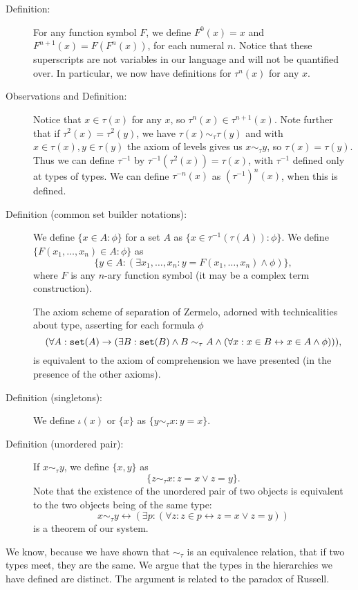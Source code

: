 \documentclass[12pt]{book}
\begin{document}
\begin{description}

\item[Definition:]  For any function symbol $F$, we define $F^0(x) = x$ and $F^{n+1}(x) = F(F^n(x))$, for each numeral $n$.  Notice that these superscripts
are not variables in our language and will not be quantified over.  In particular, we now have definitions for $\tau^n(x)$ for any $x$.

\item[Observations and Definition:]  Notice that $x \in \tau(x)$ for any $x$, so $\tau^n(x) \in \tau^{n+1}(x)$.  Note further that if $\tau^2(x) = \tau^2(y)$, we have
$\tau(x) \sim_\tau \tau(y)$ and with $x \in \tau(x),y \in \tau(y)$ the axiom of levels gives us $x \sim_\tau y$, so $\tau(x)=\tau(y)$.  Thus we can define $\tau^{-1}$ by
$\tau^{-1}(\tau^2(x)) = \tau(x)$, with $\tau^{-1}$ defined only at types of types.  We can define $\tau^{-n}(x)$ as $(\tau^{-1})^n(x)$, when this is defined.

\item[Definition (common set builder notations):]  We define $\{x \in A:\phi\}$ for a set $A$ as $\{x \in \tau^{-1}(\tau(A)):\phi\}$.  We define $\{F(x_1,\ldots,x_n) \in A:\phi\}$ as $$\{y \in A:(\exists x_1,\ldots,x_n:y = F(x_1,\ldots,x_n) \wedge \phi)\},$$ where $F$ is any $n$-ary  function symbol (it may be a complex term construction).

The axiom scheme of separation of Zermelo, adorned with technicalities about type, asserting for each formula $\phi$ $$(\forall A:{\tt set}(A)\rightarrow (\exists B:{\tt set}(B) \wedge B \sim_\tau A \wedge (\forall x:x \in B \leftrightarrow x \in A \wedge \phi))),$$ is equivalent to the axiom of comprehension we have presented (in the presence of the other axioms).

\item[Definition (singletons):]  We define $\iota(x)$ or $\{x\}$ as $\{y \sim_\tau x:y=x\}$.

\item[Definition (unordered pair):]  If $x \sim_\tau y$, we define $\{x,y\}$ as $$\{z \sim_\tau x:z=x \vee z=y\}.$$  Note that the existence of the unordered pair of two objects is equivalent to the two objects being of the same type: $$x \sim_\tau y \leftrightarrow(\exists p:(\forall z:z \in p \leftrightarrow z=x \vee z=y)) $$  is a theorem of our system.

\end{description}

We know, because we have shown that $\sim_\tau$ is an equivalence relation, that if two types meet, they are the same.  We argue that the types in the hierarchies we have defined are distinct.  The argument is related to the paradox of Russell.
\end{document}
